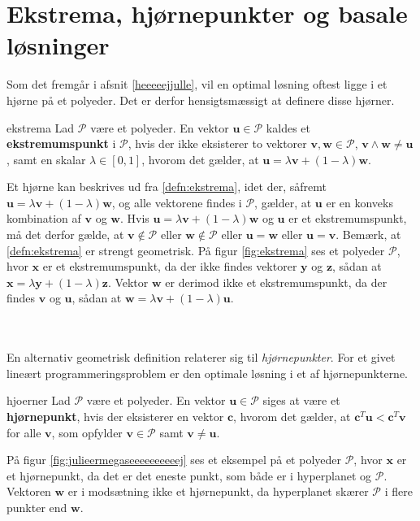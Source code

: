 \section{Ekstrema, hjørnepunkter og basale løsninger}
%
Som det fremgår i afsnit \ref{heeeeejjulle}, vil en optimal løsning oftest ligge i et hjørne på et polyeder.
Det er derfor hensigtsmæssigt at definere disse hjørner.
%
\begin{defn}{}{ekstrema}
Lad $\mathcal{P}$ være et polyeder. 
En vektor $\mathbf{u} \in \mathcal{P}$ kaldes et \textbf{ekstremumspunkt} i $\mathcal{P}$, hvis der ikke eksisterer to vektorer $\mathbf{v},\mathbf{w} \in \mathcal{P}$, $\mathbf{v} \land \mathbf{w} \neq \mathbf{u}$, samt en skalar $\lambda \in [0,1]$, hvorom det gælder, at $\mathbf{u}=\lambda\mathbf{v}+(1-\lambda)\textbf{w}$.
\end{defn}
\noindent
%
Et hjørne kan beskrives ud fra \ref{defn:ekstrema}, idet der, såfremt $\mathbf{u}=\lambda\mathbf{v}+(1-\lambda) \mathbf{w}$, og alle vektorene findes i $\mathcal{P}$, gælder, at $\mathbf{u}$ er en konveks kombination af $\mathbf{v}$ og $\mathbf{w}$.
Hvis $\mathbf{u}=\lambda \mathbf{v}+(1-\lambda) \textbf{w}$ og $\mathbf{u}$ er et ekstremumspunkt, må det derfor gælde, at $\mathbf{v}\notin \mathcal{P}$ eller $\mathbf{w}\notin \mathcal{P}$ eller $\mathbf{u}=\mathbf{w}$ eller $\mathbf{u}=\mathbf{v}$.
Bemærk, at \ref{defn:ekstrema} er strengt geometrisk. 
På figur \ref{fig:ekstrema} ses et polyeder $\mathcal{P}$, hvor $\textbf{x}$ er et ekstremumspunkt, da der ikke findes vektorer $\textbf{y}$ og $\textbf{z}$, sådan at $\mathbf{x}=\lambda\mathbf{y}+(1-\lambda) \mathbf{z}$.
Vektor $\textbf{w}$ er derimod ikke et ekstremumspunkt, da der findes $\textbf{v}$ og $\textbf{u}$, sådan at $\mathbf{w}=\lambda\mathbf{v}+(1-\lambda)\textbf{u}$.
%

\\\\
%
En alternativ geometrisk definition relaterer sig til \textit{hjørnepunkter}.
For et givet lineært programmeringsproblem er den optimale løsning i et af hjørnepunkterne.
%
\begin{defn}{}{hjoerner}
Lad $\mathcal{P}$ være et polyeder. 
En vektor $\mathbf{u}\in \mathcal{P}$ siges at være et \textbf{hjørnepunkt}, hvis der eksisterer en vektor $\mathbf{c}$, hvorom det gælder, at $\mathbf{c}^T\mathbf{u}<\mathbf{c}^T\mathbf{v}$ for alle $\mathbf{v}$, som opfylder $\mathbf{v} \in \mathcal{P}$ samt $\mathbf{v}\neq\mathbf{u}$.
\end{defn}
\noindent
%
På figur \ref{fig:julieermegaseeeeeeeeeej} ses et eksempel på et polyeder $\mathcal{P}$, hvor $\textbf{x}$ er et hjørnepunkt, da det er det eneste punkt, som både er i hyperplanet og $\mathcal{P}$.
Vektoren $\textbf{w}$ er i modsætning ikke et hjørnepunkt, da hyperplanet skærer $\mathcal{P}$ i flere punkter end $\mathbf{w}$.
%

\\\\